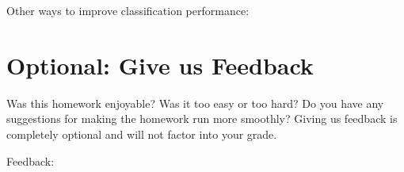 \documentclass[leqno,12pt]{article}
\begin{document}
\noindent
Other ways to improve classification performance:
\begin{tcolorbox}[fit,height=2cm, width=\linewidth, blank, borderline={1pt}{-2pt}]
\end{tcolorbox}

\section{Optional: Give us Feedback}

Was this homework enjoyable? Was it too easy or too hard? Do you have any suggestions for making the homework run more smoothly? Giving us feedback is completely optional and will not factor into your grade. \newline

\noindent
Feedback:
\begin{tcolorbox}[fit,height=4cm, width=\linewidth, blank, borderline={1pt}{-2pt}]
\end{tcolorbox}
\end{document}
